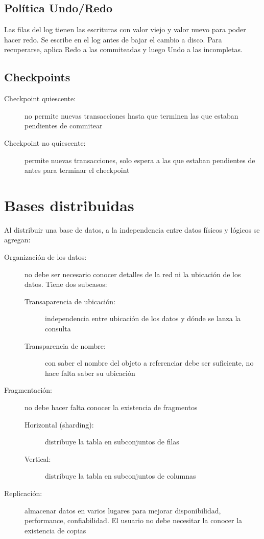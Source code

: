 \subsection{Política Undo/Redo}

Las filas del log tienen las escrituras con valor viejo y valor nuevo para poder hacer redo.
Se escribe en el log antes de bajar el cambio a disco.
Para recuperarse, aplica Redo a las commiteadas y luego Undo a las incompletas.

\subsection{Checkpoints}

\begin{description}
	\item[Checkpoint quiescente:] no permite nuevas transacciones hasta que terminen las que estaban pendientes de commitear
	\item[Checkpoint no quiescente:] permite nuevas transacciones, solo espera a las que estaban pendientes de antes para terminar el checkpoint
\end{description}

\section{Bases distribuidas}

Al distribuir una base de datos, a la independencia entre datos físicos y lógicos se agregan:

\begin{description}
	\item[Organización de los datos:] no debe ser necesario conocer detalles de la red ni la ubicación de los datos. Tiene dos subcasos:
	\begin{description}
		\item[Transaparencia de ubicación:] independencia entre ubicación de los datos y dónde se lanza la consulta
		\item[Transparencia de nombre:] con saber el nombre del objeto a referenciar debe ser suficiente, no hace falta saber su ubicación
	\end{description}
	\item[Fragmentación:] no debe hacer falta conocer la existencia de fragmentos
	\begin{description}
		\item[Horizontal (sharding):] distribuye la tabla en subconjuntos de filas
		\item[Vertical:] distribuye la tabla en subconjuntos de columnas
	\end{description}
	\item[Replicación:] almacenar datos en varios lugares para mejorar disponibilidad, performance, confiabilidad. El usuario no debe necesitar la conocer la existencia de copias
\end{description}

